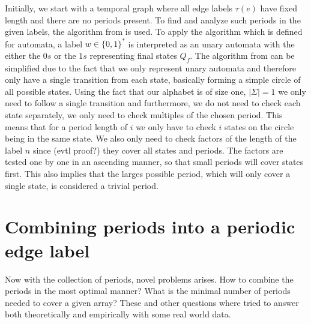 Initially, we start with a temporal graph where all edge labels $\tau(e)$ have fixed length and there are no periods present. To find and analyze such periods in the given labels, the algorithm from \cite{DBLP:journals/corr/abs-2107-04683} is used. To apply the algorithm which is defined for automata, a label $ w \in \{0,1\}^*$ is interpreted as an unary automata with the either the $0s$ or the $1s$ representing final states $Q_f$. The algorithm from \cite{DBLP:journals/corr/abs-2107-04683} can be simplified due to the fact that we only represent unary automata and therefore only have a single transition from each state, basically forming a simple circle of all possible states. Using the fact that our alphabet is of size one, $|\Sigma| = 1$ we only need to follow a single transition and furthermore, we do not need to check each state separately, we only need to check multiples of the chosen period. This means that for a period length of $i$ we only have to check $i$ states on the circle being in the same state. We also only need to check factors of the length of the label $n$ since (evtl proof?) they cover all states and periods.
The factors are tested one by one in an ascending manner, so that small periods will cover states first. This also implies that the larges possible period, which will only cover a single state, is considered a trivial period.

\section{Combining periods into a periodic edge label}

Now with the collection of periods, novel problems arises. How to combine the periods in the most optimal manner? What is the minimal number of periods needed to cover a given array? These and other questions where tried to answer both theoretically and empirically with some real world data.

